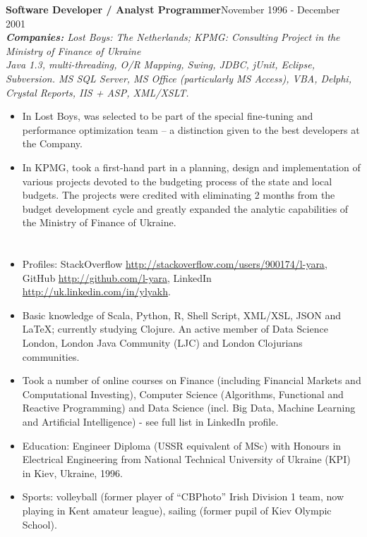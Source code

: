 \documentclass{res}
\newcommand{\aggjobdes}[4]{\needspace{3\baselineskip} %
{\noindent \bf #1\hspace{2ex}}{\hfill #2}\\
{{\noindent \small \textit{ \textbf{ Companies:} {\hfill #3}}}}\\{{\it \small #4.}}}
\newcommand{\osection}[1]{\section{\sc {\Large \textbf{#1}\\}} \vspace{0.30cm}}
\begin{document}
\begin{resume}
\aggjobdes {Software Developer / Analyst Programmer}{November 1996 - December 2001}
{Lost Boys: The Netherlands; KPMG: Consulting Project in the Ministry of Finance of Ukraine}
{Java 1.3, multi-threading, O/R Mapping, Swing, JDBC, jUnit, Eclipse, Subversion. MS SQL Server, MS Office (particularly MS Access), VBA, Delphi, Crystal Reports, IIS + ASP, XML/XSLT}
\begin{itemize} %
 \item In Lost Boys, was selected to be part of the special fine-tuning and performance optimization team – a distinction given to the best developers at the Company.
 \item In KPMG, took a first-hand part in a planning, design and implementation of various projects devoted to the budgeting process of the state and local budgets.  The projects were credited with eliminating 2 months from the budget development cycle and greatly expanded the analytic capabilities of the Ministry of Finance of Ukraine.
\end{itemize}

\osection{SPECIALS}
\begin{itemize}
 \item Profiles: StackOverflow \url{http://stackoverflow.com/users/900174/l-yara}, GitHub \url{http://github.com/l-yara}, LinkedIn \url{http://uk.linkedin.com/in/ylyakh}.
 \item Basic knowledge of Scala, Python, R, Shell Script, XML/XSL, JSON and \LaTeX; currently studying Clojure. An active member of Data Science London, London Java Community (LJC) and London Clojurians communities.
 \item
   Took a number of online courses on Finance (including Financial Markets and Computational Investing), Computer Science (Algorithms, Functional and Reactive Programming) and Data Science (incl. Big Data, Machine Learning and Artificial Intelligence) - see full list in LinkedIn profile.
 \item Education: Engineer Diploma (USSR equivalent of MSc) with Honours in Electrical Engineering from National Technical University of Ukraine (KPI) in Kiev, Ukraine, 1996.
 \item Sports: volleyball (former player of ``CBPhoto'' Irish Division 1 team, now playing in Kent amateur league), sailing (former pupil of Kiev Olympic School).
\end{itemize}


\end{resume}
\end{document}
